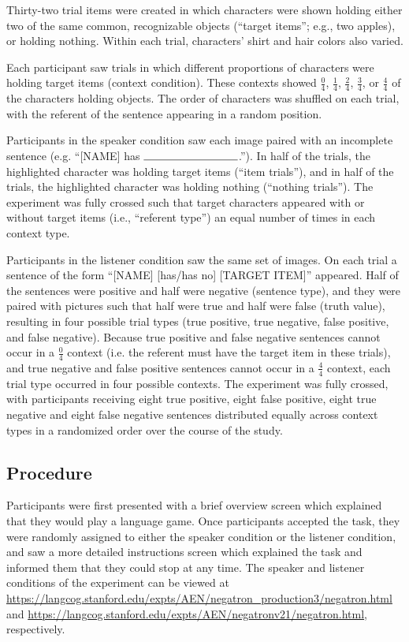 \documentclass[man, noapacite]{apa2}
\begin{document}
Thirty-two trial items were created in which characters were shown holding either two of the same common, recognizable objects (``target items''; e.g., two apples), or holding nothing. Within each trial, characters' shirt and hair colors also varied. 

Each participant saw trials in which different proportions of characters were holding target items (context condition).  These contexts showed $\frac{0}{4}$, $\frac{1}{4}$, $\frac{2}{4}$, $\frac{3}{4}$, or $\frac{4}{4}$ of the characters holding objects. The order of characters was shuffled on each trial, with the referent of the sentence appearing in a random position. 

Participants in the speaker condition saw each image paired with an incomplete sentence (e.g. ``[NAME] has $\rule{3cm}{0.15mm}$.''). In half of the trials, the highlighted character was holding target items (``item trials''), and in half of the trials, the highlighted character was holding nothing (``nothing trials'').  The experiment was fully crossed such that target characters appeared with or without target items (i.e., ``referent type'') an equal number of times in each context type.  

Participants in the listener condition saw the same set of images.  On each trial a sentence of the form ``[NAME] [has/has no] [TARGET ITEM]'' appeared.  Half of the sentences were positive and half were negative (sentence type), and they were paired with pictures such that half were true and half were false (truth value), resulting in four possible trial types (true positive, true negative, false positive, and false negative).  Because true positive and false negative sentences cannot occur in a $\frac{0}{4}$ context (i.e. the referent must have the target item in these trials), and true negative and false positive sentences cannot occur in a $\frac{4}{4}$ context, each trial type occurred in four possible contexts.  The experiment was fully crossed, with participants receiving eight true positive, eight false positive, eight true negative and eight false negative sentences distributed equally across context types in a randomized order over the course of the study.  

\subsection{Procedure}

Participants were first presented with a brief overview screen which explained that they would play a language game.  Once participants accepted the task, they were randomly assigned to either the speaker condition or the listener condition, and saw a more detailed instructions screen which explained the task and informed them that they could stop at any time. The speaker and listener conditions of the experiment can be viewed at \url{https://langcog.stanford.edu/expts/AEN/negatron_production3/negatron.html} and \url{https://langcog.stanford.edu/expts/AEN/negatronv21/negatron.html}, respectively.
\end{document}
